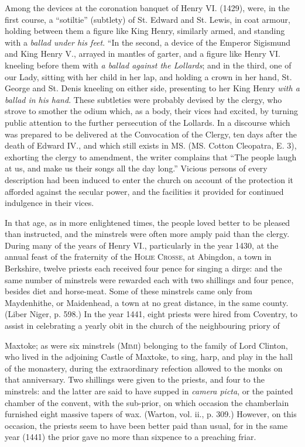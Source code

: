 Among the devices at the coronation banquet of Henry VI. (1429), were, in
the first course, a “sotiltie” (subtlety) of St. Edward and St. Lewis, in coat
armour, holding between them a figure like King Henry, similarly armed, and
standing with a \textit{ballad under his feet}. “In the second, a device of the Emperor
Sigismund and King Henry V., arrayed in mantles of garter, and a figure like
Henry VI. kneeling before them with \textit{a ballad against the Lollards}; and in the
third, one of our Lady, sitting with her child in her lap, and holding a crown in
her hand, St. George and St. Denis kneeling on either side, presenting to her
King Henry \textit{with a ballad in his hand}. These subtleties were probably devised
by the clergy, who strove to smother the odium which, as a body, their vices had
excited, by turning public attention to the further persecution of the Lollards.
In a discourse which was prepared to be delivered at the Convocation of the
Clergy, ten days after the death of Edward IV., and which still exists in MS.
(MS. Cotton Cleopatra, E. 3), exhorting the clergy to amendment, the writer
complains that “The people laugh at us, and make us their songs all the day
long.” Vicious persons of every description had been induced to enter the church
on account of the protection it afforded against the secular power, and the facilities
it provided for continued indulgence in their vices.

In that age, as in more enlightened times, the people loved better to be pleased
than instructed, and the minstrels were often more amply paid than the clergy.
During many of the years of Henry VI., particularly in the year 1430, at the
annual feast of the fraternity of the \textsc{Holie Crosse}, at Abingdon, a town in
Berkshire, twelve priests each received four pence for singing a dirge: and the
same number of minstrels were rewarded each with two shillings and four pence,
besides diet and horse-meat. Some of these minstrels came only from Maydenhithe, 
or Maidenhead, a town at no great distance, in the same county. (Liber
Niger, p. 598.) In the year 1441, eight priests were hired from Coventry,
to assist in celebrating a yearly obit in the church \pagebreak 
of the neighbouring priory of
Maxtoke; as were six minstrels (\textsc{Mimi}) belonging to the family of Lord Clinton,
who lived in the adjoining Castle of Maxtoke, to sing, harp, and play in the hall
of the monastery, during the extraordinary refection allowed to the monks on that
anniversary. Two shillings were given to the priests, and four to the minstrels:
and the latter are said to have supped in \textit{camera picta}, or the painted chamber of
the convent, with the sub-prior, on which occasion the chamberlain furnished
eight massive tapers of wax. (Warton, vol. ii., p. 309.) However, on this occasion,
the priests seem to have been better paid than usual, for in the same year
(1441) the prior gave no more than sixpence to a preaching friar.

